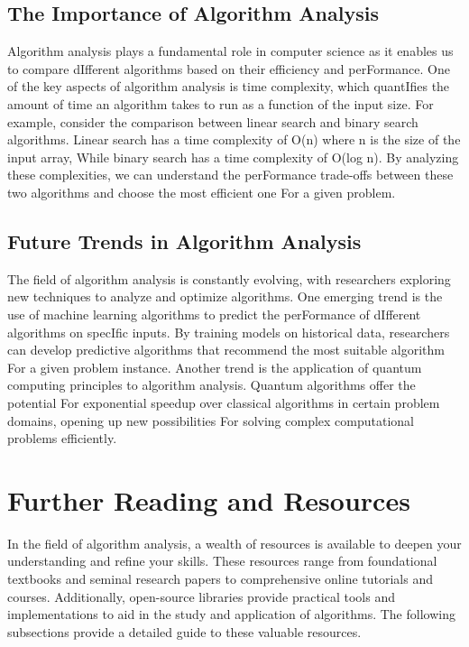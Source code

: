 \documentclass[12pt]{book} %
\begin{document}
\subsection{The Importance of Algorithm Analysis}
Algorithm analysis plays a fundamental role in computer science as it enables us to compare dIfferent algorithms based on their efficiency and perFormance. One of the key aspects of algorithm analysis is time complexity, which quantIfies the amount of time an algorithm takes to run as a function of the input size. For example, consider the comparison between linear search and binary search algorithms. Linear search has a time complexity of O(n) where n is the size of the input array, While binary search has a time complexity of O(log n). By analyzing these complexities, we can understand the perFormance trade-offs between these two algorithms and choose the most efficient one For a given problem.

\subsection{Future Trends in Algorithm Analysis}
The field of algorithm analysis is constantly evolving, with researchers exploring new techniques to analyze and optimize algorithms. One emerging trend is the use of machine learning algorithms to predict the perFormance of dIfferent algorithms on specIfic inputs. By training models on historical data, researchers can develop predictive algorithms that recommend the most suitable algorithm For a given problem instance. Another trend is the application of quantum computing principles to algorithm analysis. Quantum algorithms offer the potential For exponential speedup over classical algorithms in certain problem domains, opening up new possibilities For solving complex computational problems efficiently.


\section{Further Reading and Resources}
In the field of algorithm analysis, a wealth of resources is available to deepen your understanding and refine your skills. These resources range from foundational textbooks and seminal research papers to comprehensive online tutorials and courses. Additionally, open-source libraries provide practical tools and implementations to aid in the study and application of algorithms. The following subsections provide a detailed guide to these valuable resources.
\end{document}
